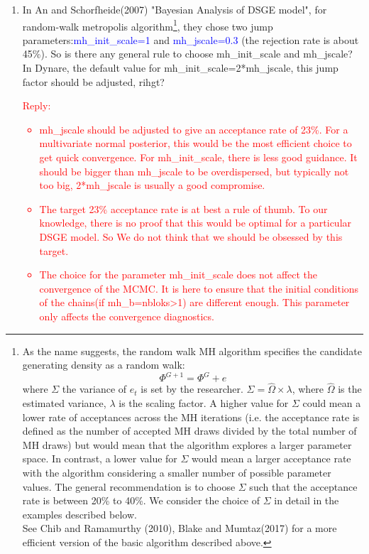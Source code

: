 \documentclass[cn,10pt,math=newtx,citestyle=gb7714-2015,bibstyle=gb7714-2015]{elegantbook}
\begin{document}
{{\begin{enumerate}
		\item In An and Schorfheide(2007) "Bayesian Analysis of DSGE model", for random-walk metropolis algorithm\footnote{As the name suggests, the random walk MH algorithm specifies the candidate generating density as a random walk:
			$$\Phi^{G+1}=\Phi^G+e$$
			where $\Sigma$ the variance of $e_t$ is set by the researcher. $\Sigma=\hat{\Omega}\times \lambda$, where $\hat{\Omega}$ is the estimated variance, $\lambda$ is the scaling factor. A higher value for $\Sigma$ could mean a lower rate of acceptances across the MH iterations (i.e. the acceptance rate is defined as the number of accepted MH draws divided by the total number of MH draws) but would mean that the algorithm explores a larger parameter space. In contrast, a lower value for $\Sigma$ would mean a larger acceptance rate with the algorithm considering a smaller number of possible parameter values. The general recommendation is to choose $\Sigma$ such that the acceptance rate is between 20\% to 40\%. We consider the choice of $\Sigma$ in detail in the examples described below.\\
			See Chib and Ramamurthy (2010), Blake and Mumtaz(2017) for a more efficient version of the basic algorithm described above.}, they chose two jump parameters:\textcolor{blue}{mh\_init\_scale=1} and \textcolor{blue}{mh\_jscale=0.3} (the rejection rate is about 45\%). So is there any general rule to choose mh\_init\_scale and mh\_jscale? In Dynare, the default value for mh\_init\_scale=2*mh\_jscale, this jump factor should be adjusted, rihgt?\\
		\textcolor{red}{Reply:
			\begin{itemize}
				\item mh\_jscale should be adjusted to give an acceptance rate of 23\%. For a multivariate normal posterior, this would be the most efficient choice to get quick convergence. For mh\_init\_scale, there is less good guidance. It should be bigger than mh\_jscale to be overdispersed, but typically not too big, 2*mh\_jscale is usually a good compromise.
				\item The target 23\% acceptance rate is at best a rule of thumb. To our knowledge, there is no proof that this would be optimal for a particular DSGE model. So We do not think that we should be obsessed by this target.
				\item The choice for the parameter mh\_init\_scale does not affect the convergence of the MCMC. It is here to ensure that the initial conditions of the chains(if mh\_b=nbloks>1) are different enough. This parameter only affects the convergence diagnostics.

\end{itemize}}
\end{enumerate}}}
\end{document}
